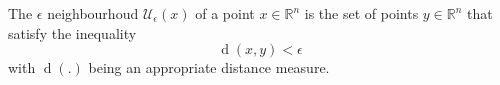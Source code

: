 The $\epsilon$ neighbourhoud $\mathcal{U}_{\epsilon}(x)$  of a point $x \in \mathbb{R}^n$ is the set of points $y \in \mathbb{R}^n$ that satisfy the inequality
$$\operatorname{d}(x, y) < \epsilon$$
with $\operatorname{d}(.)$ being an appropriate distance measure.
